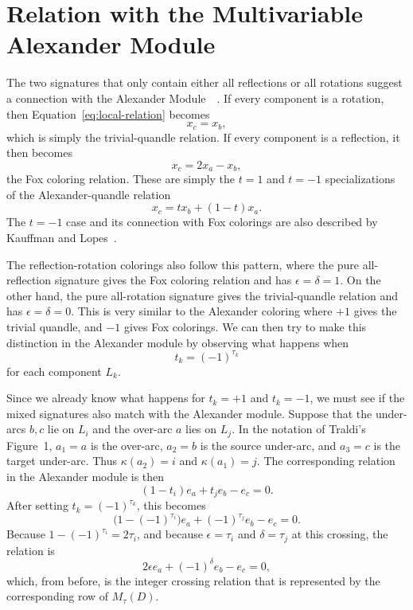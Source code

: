 \documentclass[11pt]{article}
\theoremstyle{definition}
\begin{document}
\section{Relation with the Multivariable Alexander Module}
\label{sec:alexander-specialization}

The two signatures that only contain either all reflections or all rotations suggest a connection with the Alexander Module~\cite[Definition~2 and Proposition~6]{traldi2020}~\cite[Definitions~4, 6, and~7]{traldi2025}. If every component is a rotation, then Equation~\eqref{eq:local-relation} becomes
\[
x_c=x_b,
\]
which is simply the trivial-quandle relation. If every component is a reflection, it then becomes
\[
x_c=2x_a-x_b,
\]
the Fox coloring relation. These are simply the $t=1$ and $t=-1$ specializations of the Alexander-quandle relation~\cite[Proposition~6]{traldi2020}
\[
x_c=tx_b+(1-t)x_a.
\]
The $t=-1$ case and its connection with Fox colorings are also described by Kauffman and Lopes~\cite[Section~2.1]{kauffman}.

The reflection-rotation colorings also follow this pattern, where the pure all-reflection signature gives the Fox coloring relation and has $\epsilon=\delta=1$. On the other hand, the pure all-rotation signature gives the trivial-quandle relation and has $\epsilon=\delta=0$. This is very similar to the Alexander coloring where $+1$ gives the trivial quandle, and $-1$ gives Fox colorings. We can then try to make this distinction in the Alexander module by observing what happens when
\[
t_k=(-1)^{\tau_k}
\]
for each component $L_k$.

Since we already know what happens for $t_k=+1$ and $t_k=-1$, we must see if the mixed signatures also match with the Alexander module. Suppose that the under-arcs $b,c$ lie on $L_i$ and the over-arc $a$ lies on $L_j$. In the notation of Traldi's Figure~1, \(a_1=a\) is the over-arc, \(a_2=b\) is the source under-arc, and \(a_3=c\) is the target under-arc. Thus \(\kappa(a_2)=i\) and \(\kappa(a_1)=j\). The corresponding relation in the Alexander module is then~\cite[Definitions~3 and 4]{traldi2018}
\begin{equation}
(1-t_i)e_a+t_je_b-e_c=0.
\label{eq:alexander-signature}
\end{equation}
After setting $t_k=(-1)^{\tau_k}$, this becomes
\[
\bigl(1-(-1)^{\tau_i}\bigr)e_a
+(-1)^{\tau_j}e_b-e_c=0.
\]
Because $1-(-1)^{\tau_i}=2\tau_i$, and because $\epsilon=\tau_i$ and $\delta=\tau_j$ at this crossing, the relation is
\[
2\epsilon e_a+(-1)^\delta e_b-e_c=0,
\]
which, from before, is the integer crossing relation that is represented by the corresponding row of $M_\tau(D)$.
\end{document}
